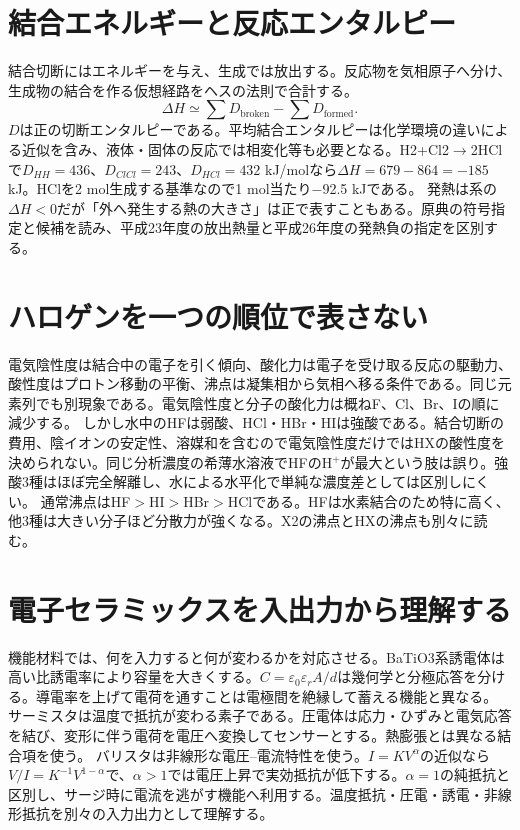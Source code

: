 \section{結合エネルギーと反応エンタルピー}
\label{theory:basicchem:enthalpy}
結合切断にはエネルギーを与え、生成では放出する。反応物を気相原子へ分け、生成物の結合を作る仮想経路をヘスの法則で合計する\autocite{mit_bond_enthalpy}。
\begin{equation}\Delta H\simeq\sum D_{\mathrm{broken}}-\sum D_{\mathrm{formed}}.\end{equation}
\(D\)は正の切断エンタルピーである。平均結合エンタルピーは化学環境の違いによる近似を含み、液体・固体の反応では相変化等も必要となる。H2+Cl2\(\to\)2HClで\(D_{HH}=436\)、\(D_{ClCl}=243\)、\(D_{HCl}=432\) kJ/molなら\(\Delta H=679-864=-185\) kJ。HClを2 mol生成する基準なので1 mol当たり−92.5 kJである。
発熱は系の\(\Delta H<0\)だが「外へ発生する熱の大きさ」は正で表すこともある。原典の符号指定と候補を読み、平成23年度の放出熱量と平成26年度の発熱負の指定を区別する。

\section{ハロゲンを一つの順位で表さない}
\label{theory:basicchem:halogen}
電気陰性度は結合中の電子を引く傾向、酸化力は電子を受け取る反応の駆動力、酸性度はプロトン移動の平衡、沸点は凝集相から気相へ移る条件である。同じ元素列でも別現象である。電気陰性度と分子の酸化力は概ねF、Cl、Br、Iの順に減少する\autocite{purdue_halogens,rsc_halogen}。
しかし水中のHFは弱酸、HCl・HBr・HIは強酸である。結合切断の費用、陰イオンの安定性、溶媒和を含むので電気陰性度だけではHXの酸性度を決められない\autocite{purdue_acid_strength,yale_hydrohalic}。同じ分析濃度の希薄水溶液でHFのH\({}^+\)が最大という肢は誤り。強酸3種はほぼ完全解離し、水による水平化で単純な濃度差としては区別しにくい。
通常沸点はHF\(>\)HI\(>\)HBr\(>\)HClである\autocite{nist_halogen_properties,msu_hydrogen_bonding}。HFは水素結合のため特に高く、他3種は大きい分子ほど分散力が強くなる。X2の沸点とHXの沸点も別々に読む。

\section{電子セラミックスを入出力から理解する}
\label{theory:basicchem:ceramics}
機能材料では、何を入力すると何が変わるかを対応させる。BaTiO3系誘電体は高い比誘電率により容量を大きくする\autocite{murata_batio3}。\(C=\varepsilon_0\varepsilon_r A/d\)は幾何学と分極応答を分ける。導電率を上げて電荷を通すことは電極間を絶縁して蓄える機能と異なる。
サーミスタは温度で抵抗が変わる素子である\autocite{murata_thermistor}。圧電体は応力・ひずみと電気応答を結び、変形に伴う電荷を電圧へ変換してセンサーとする\autocite{murata_piezo}。熱膨張とは異なる結合項を使う。
バリスタは非線形な電圧–電流特性を使う\autocite{tdk_varistor}。\(I=KV^\alpha\)の近似なら\(V/I=K^{-1}V^{1-\alpha}\)で、\(\alpha>1\)では電圧上昇で実効抵抗が低下する。\(\alpha=1\)の純抵抗と区別し、サージ時に電流を逃がす機能へ利用する。温度抵抗・圧電・誘電・非線形抵抗を別々の入力出力として理解する。

